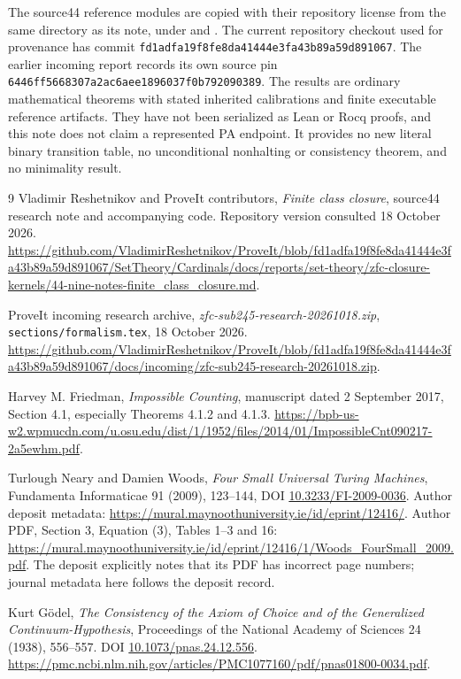 The source44 reference modules are copied with their repository license
from the same directory as its note, under
 and
. The current repository
checkout used for provenance has commit
\nolinkurl{fd1adfa19f8fe8da41444e3fa43b89a59d891067}. The earlier incoming
report records its own source pin
\nolinkurl{6446ff5668307a2ac6aee1896037f0b792090389}.
The results are ordinary mathematical theorems with stated inherited
calibrations and finite executable reference artifacts. They have not been
serialized as Lean or Rocq proofs, and this note does not claim a represented
PA endpoint. It provides no new literal binary transition table, no
unconditional nonhalting or consistency theorem, and no minimality result.
\begin{thebibliography}{9}
Vladimir Reshetnikov and ProveIt contributors,
\emph{Finite class closure}, source44 research note and accompanying code.
Repository version consulted 18 October 2026.
\url{https://github.com/VladimirReshetnikov/ProveIt/blob/fd1adfa19f8fe8da41444e3fa43b89a59d891067/SetTheory/Cardinals/docs/reports/set-theory/zfc-closure-kernels/44-nine-notes-finite_class_closure.md}.

ProveIt incoming research archive,
\emph{zfc-sub245-research-20261018.zip},
\texttt{sections/formalism.tex}, 18 October 2026.
\url{https://github.com/VladimirReshetnikov/ProveIt/blob/fd1adfa19f8fe8da41444e3fa43b89a59d891067/docs/incoming/zfc-sub245-research-20261018.zip}.

Harvey M. Friedman,
\emph{Impossible Counting}, manuscript dated 2 September 2017,
Section 4.1, especially Theorems 4.1.2 and 4.1.3.
\url{https://bpb-us-w2.wpmucdn.com/u.osu.edu/dist/1/1952/files/2014/01/ImpossibleCnt090217-2a5ewhm.pdf}.

Turlough Neary and Damien Woods,
\emph{Four Small Universal Turing Machines},
Fundamenta Informaticae 91 (2009), 123--144,
DOI \href{https://doi.org/10.3233/FI-2009-0036}{10.3233/FI-2009-0036}.
Author deposit metadata:
\url{https://mural.maynoothuniversity.ie/id/eprint/12416/}.
Author PDF, Section 3, Equation (3), Tables 1--3 and 16:
\url{https://mural.maynoothuniversity.ie/id/eprint/12416/1/Woods_FourSmall_2009.pdf}.
The deposit explicitly notes that its PDF has incorrect page numbers;
journal metadata here follows the deposit record.

Kurt G\"odel,
\emph{The Consistency of the Axiom of Choice and of the Generalized
Continuum-Hypothesis}, Proceedings of the National Academy of Sciences
24 (1938), 556--557.
DOI \href{https://doi.org/10.1073/pnas.24.12.556}{10.1073/pnas.24.12.556}.
\url{https://pmc.ncbi.nlm.nih.gov/articles/PMC1077160/pdf/pnas01800-0034.pdf}.
\end{thebibliography}
